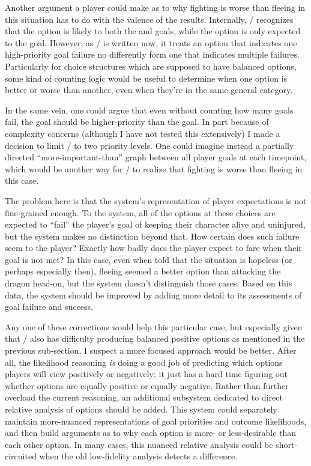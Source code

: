Another argument a player could make as to why fighting is worse than fleeing in this situation has to do with the valence of the results.
%
Internally, \dunyazad/ recognizes that the  option is likely to  both the  and  goals, while the  option is only expected to  the  goal.
%
However, as \dunyazad/ is written now, it treats an option that indicates one high-priority goal failure no differently form one that indicates multiple failures.
%
Particularly for choice structures which are supposed to have balanced options, some kind of counting logic would be useful to determine when one option is better or worse than another, even when they're in the same general category.


In the same vein, one could argue that even without counting how many goals fail, the  goal should be higher-priority than the  goal.
%
In part because of complexity concerns (although I have not tested this extensively) I made a decision to limit \dunyazad/ to two priority levels.
%
One could imagine instead a partially directed ``more-important-than'' graph between all player goals at each timepoint, which would be another way for \dunyazad/ to realize that fighting is worse than fleeing in this case.


The problem here is that the system's representation of player expectations is not fine-grained enough.
%
To the system, all of the options at these choices are expected to ``fail'' the player's goal of keeping their character alive and uninjured, but the system makes no distinction beyond that.
%
How certain does such failure seem to the player?
%
Exactly how badly does the player expect to fare when their goal is not met?
%
In this case, even when told that the situation is hopeless (or perhaps especially then), fleeing seemed a better option than attacking the dragon head-on, but the system doesn't distinguish those cases.
%
Based on this data, the system should be improved by adding more detail to its assessments of goal failure and success.


Any one of these corrections would help this particular case, but especially given that \dunyazad/ also has difficulty producing balanced positive options as mentioned in the previous sub-section, I suspect a more focused approach would be better.
%
After all, the likelihood reasoning \emph{is} doing a good job of predicting which options players will view positively or negatively; it just has a hard time figuring out whether options are equally positive or equally negative.
%
Rather than further overload the current reasoning, an additional subsystem dedicated to direct relative analysis of options should be added.
%
This system could separately maintain more-nuanced representations of goal priorities and outcome likelihoods, and then build arguments as to why each option is more- or less-desirable than each other option.
%
In many cases, this nuanced relative analysis could be short-circuited when the old low-fidelity analysis detects a difference.


